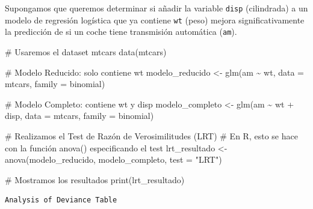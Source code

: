 \documentclass[
  letterpaper,
  DIV=11,
  numbers=noendperiod]{scrreprt}
\newenvironment{Shaded}{\begin{snugshade}}{\end{snugshade}}
\newcommand{\AttributeTok}[1]{\textcolor[rgb]{0.40,0.45,0.13}{#1}}
\newcommand{\CommentTok}[1]{\textcolor[rgb]{0.37,0.37,0.37}{#1}}
\newcommand{\FunctionTok}[1]{\textcolor[rgb]{0.28,0.35,0.67}{#1}}
\newcommand{\NormalTok}[1]{\textcolor[rgb]{0.00,0.23,0.31}{#1}}
\newcommand{\OtherTok}[1]{\textcolor[rgb]{0.00,0.23,0.31}{#1}}
\newcommand{\SpecialCharTok}[1]{\textcolor[rgb]{0.37,0.37,0.37}{#1}}
\newcommand{\StringTok}[1]{\textcolor[rgb]{0.13,0.47,0.30}{#1}}
\begin{document}
\begin{tcolorbox}[enhanced jigsaw, leftrule=.75mm, breakable, colbacktitle=quarto-callout-tip-color!10!white, bottomrule=.15mm, colframe=quarto-callout-tip-color-frame, toprule=.15mm, colback=white, coltitle=black, bottomtitle=1mm, left=2mm, title=\textcolor{quarto-callout-tip-color}{\faLightbulb}\hspace{0.5em}{Ejemplo: Comparando Modelos con el Test de Razón de Verosimilitudes}, opacityback=0, arc=.35mm, opacitybacktitle=0.6, toptitle=1mm, titlerule=0mm, rightrule=.15mm]

Supongamos que queremos determinar si añadir la variable \texttt{disp}
(cilindrada) a un modelo de regresión logística que ya contiene
\texttt{wt} (peso) mejora significativamente la predicción de si un
coche tiene transmisión automática (\texttt{am}).

\begin{Shaded}
\begin{Highlighting}[]
\CommentTok{\# Usaremos el dataset mtcars}
\FunctionTok{data}\NormalTok{(mtcars)}

\CommentTok{\# Modelo Reducido: solo contiene \textquotesingle{}wt\textquotesingle{}}
\NormalTok{modelo\_reducido }\OtherTok{\textless{}{-}} \FunctionTok{glm}\NormalTok{(am }\SpecialCharTok{\textasciitilde{}}\NormalTok{ wt, }\AttributeTok{data =}\NormalTok{ mtcars, }\AttributeTok{family =}\NormalTok{ binomial)}

\CommentTok{\# Modelo Completo: contiene \textquotesingle{}wt\textquotesingle{} y \textquotesingle{}disp\textquotesingle{}}
\NormalTok{modelo\_completo }\OtherTok{\textless{}{-}} \FunctionTok{glm}\NormalTok{(am }\SpecialCharTok{\textasciitilde{}}\NormalTok{ wt }\SpecialCharTok{+}\NormalTok{ disp, }\AttributeTok{data =}\NormalTok{ mtcars, }\AttributeTok{family =}\NormalTok{ binomial)}

\CommentTok{\# Realizamos el Test de Razón de Verosimilitudes (LRT)}
\CommentTok{\# En R, esto se hace con la función anova() especificando el test}
\NormalTok{lrt\_resultado }\OtherTok{\textless{}{-}} \FunctionTok{anova}\NormalTok{(modelo\_reducido, modelo\_completo, }\AttributeTok{test =} \StringTok{"LRT"}\NormalTok{)}

\CommentTok{\# Mostramos los resultados}
\FunctionTok{print}\NormalTok{(lrt\_resultado)}
\end{Highlighting}
\end{Shaded}

\begin{verbatim}
Analysis of Deviance Table


\end{verbatim}
\end{tcolorbox}
\end{document}
